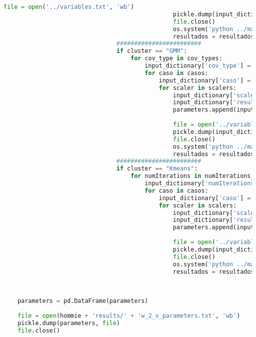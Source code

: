 \documentclass[12pt]{article}
\begin{document}
\begin{lstlisting}[language=Python, 
	caption = Rutina de pruebas Word2Vec,
		label={lst:pruebasW2V}]
												file = open('../variables.txt', 'wb')
												pickle.dump(input_dictionary, file)
												file.close()
												os.system('python ../mainapp.py')
												resultados = resultados + 1
								########################
								if cluster == "GMM":
									for cov_type in cov_types:
										input_dictionary['cov_type'] = cov_type            
										for caso in casos:
											input_dictionary['caso'] = caso
											for scaler in scalers:
												input_dictionary['scaler'] = scaler
												input_dictionary['resultados'] = resultados
												parameters.append(input_dictionary.copy())
												
												file = open('../variables.txt', 'wb')
												pickle.dump(input_dictionary, file)
												file.close()
												os.system('python ../mainapp.py')
												resultados = resultados + 1 
								########################
								if cluster == "Kmeans":
									for numIterations in numIterations_s:
										input_dictionary['numIterations'] = numIterations              
										for caso in casos:
											input_dictionary['caso'] = caso
											for scaler in scalers:    
												input_dictionary['scaler'] = scaler
												input_dictionary['resultados'] = resultados
												parameters.append(input_dictionary.copy())
												
												file = open('../variables.txt', 'wb')
												pickle.dump(input_dictionary, file)
												file.close()
												os.system('python ../mainapp.py')
												resultados = resultados + 1 
	
	
	
	parameters = pd.DataFrame(parameters)
	
	file = open(hommie + 'results/' + 'w_2_v_parameters.txt', 'wb')
	pickle.dump(parameters, file)
	file.close()
	
	\end{lstlisting}
	
	
	
\end{document}
